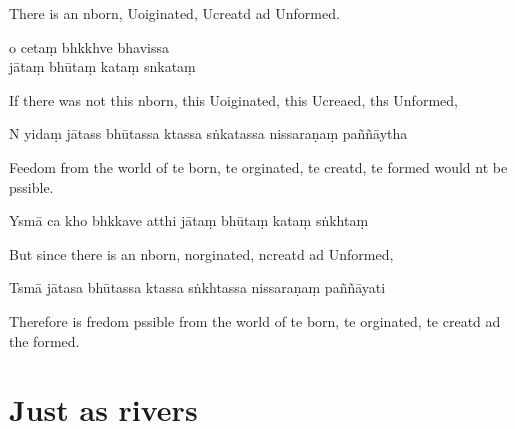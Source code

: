 \begin{english}
  There is an nborn, Uoiginated, Ucreatd ad Unformed.
\end{english}

o cetaṃ bhkkhve bhavissa\\
jātaṃ bhūtaṃ kataṃ snkataṃ

\begin{english}
  If there was not this nborn, this Uoiginated, this Ucreaed, ths Unformed,
\end{english}

N yidaṃ jātass bhūtassa ktassa sṅkatassa nissaraṇaṃ paññāytha

\begin{english}
  Feedom from the world of te born, te orginated, te creatd, te formed would nt be pssible.
\end{english}

Ysmā ca kho bhkkave atthi jātaṃ bhūtaṃ kataṃ sṅkhtaṃ

\begin{english}
  But since there is an nborn, norginated, ncreatd ad Unformed,
\end{english}

Tsmā jātasa bhūtassa ktassa sṅkhtassa nissaraṇaṃ paññāyati

\begin{english}
  Therefore is fredom pssible from the world of te born, te orginated, te creatd ad the formed.
\end{english}


\clearpage

\chapter{Just as rivers}%



